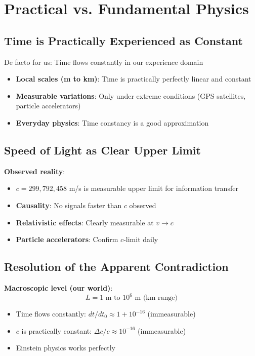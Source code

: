 \documentclass[12pt,a4paper]{article}
\theoremstyle{definition}
\theoremstyle{remark}
\begin{document}
	\section{Practical vs. Fundamental Physics}
	
	\subsection{Time is Practically Experienced as Constant}
	
	De facto for us: Time flows constantly in our experience domain
	\begin{itemize}
		\item \textbf{Local scales (m to km)}: Time is practically perfectly linear and constant
		\item \textbf{Measurable variations}: Only under extreme conditions (GPS satellites, particle accelerators)
		\item \textbf{Everyday physics}: Time constancy is a good approximation
	\end{itemize}
	
	\subsection{Speed of Light as Clear Upper Limit}
	
	\textbf{Observed reality}:
	\begin{itemize}
		\item $c = 299,792,458$ m/s is measurable upper limit for information transfer
		\item \textbf{Causality}: No signals faster than $c$ observed
		\item \textbf{Relativistic effects}: Clearly measurable at $v \rightarrow c$
		\item \textbf{Particle accelerators}: Confirm $c$-limit daily
	\end{itemize}
	
	\subsection{Resolution of the Apparent Contradiction}
	
	\textbf{Macroscopic level (our world)}:
	\begin{equation}
		L = 1 \text{ m to } 10^6 \text{ m (km range)}
	\end{equation}
	
	\begin{itemize}
		\item Time flows constantly: $dt/dt_0 \approx 1 + 10^{-16}$ (immeasurable)
		\item $c$ is practically constant: $\Delta c/c \approx 10^{-16}$ (immeasurable)
		\item Einstein physics works perfectly
	\end{itemize}
	
\end{document}

